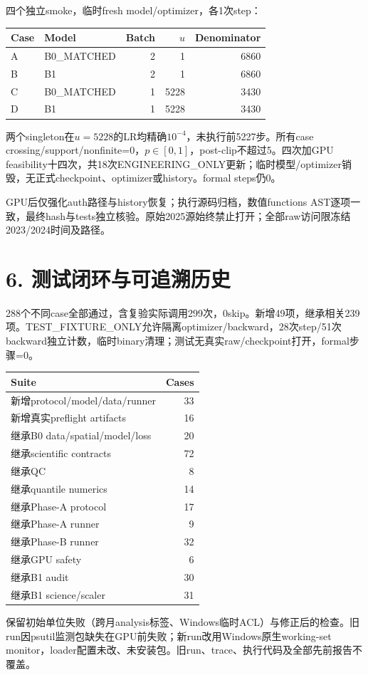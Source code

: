 \documentclass[10pt,a4paper,fontset=windows]{ctexart}
\begin{document}
四个独立smoke，临时fresh model/optimizer，各1次step：
\begin{center}\begin{tabular}{llrrr}\toprule
Case & Model & Batch & $u$ & Denominator\\\midrule
A & B0\_MATCHED & 2 & 1 & 6860 \\
B & B1 & 2 & 1 & 6860 \\
C & B0\_MATCHED & 1 & 5228 & 3430 \\
D & B1 & 1 & 5228 & 3430 \\
\bottomrule\end{tabular}\end{center}
两个singleton在$u=5228$的LR均精确$10^{-4}$，未执行前5227步。所有case crossing/support/nonfinite=0，$p\in[0,1]$，post-clip不超过5。四次加GPU feasibility十四次，共18次ENGINEERING\_ONLY更新；临时模型/optimizer销毁，无正式checkpoint、optimizer或history。formal steps仍0。

GPU后仅强化auth路径与history恢复；执行源码归档，数值functions AST逐项一致，最终hash与tests独立核验。原始2025源始终禁止打开；全部raw访问限冻结2023/2024时间及路径。
\newpage
\section*{6. 测试闭环与可追溯历史}
288个不同case全部通过，含复验实际调用299次，0skip。新增49项，继承相关239项。TEST\_FIXTURE\_ONLY允许隔离optimizer/backward，28次step/51次backward独立计数，临时binary清理；测试无真实raw/checkpoint打开，formal步骤=0。
\begin{center}{\small\begin{tabular}{lr}\toprule
Suite & Cases\\\midrule
新增protocol/model/data/runner & 33 \\
新增真实preflight artifacts & 16 \\
继承B0 data/spatial/model/loss & 20 \\
继承scientific contracts & 72 \\
继承QC & 8 \\
继承quantile numerics & 14 \\
继承Phase-A protocol & 17 \\
继承Phase-A runner & 9 \\
继承Phase-B runner & 32 \\
继承GPU safety & 6 \\
继承B1 audit & 30 \\
继承B1 science/scaler & 31 \\
\bottomrule\end{tabular}}\end{center}
保留初始单位失败（跨月analysis标签、Windows临时ACL）与修正后的检查。旧run因psutil监测包缺失在GPU前失败；新run改用Windows原生working-set monitor，loader配置未改、未安装包。旧run、trace、执行代码及全部先前报告不覆盖。
\end{document}
